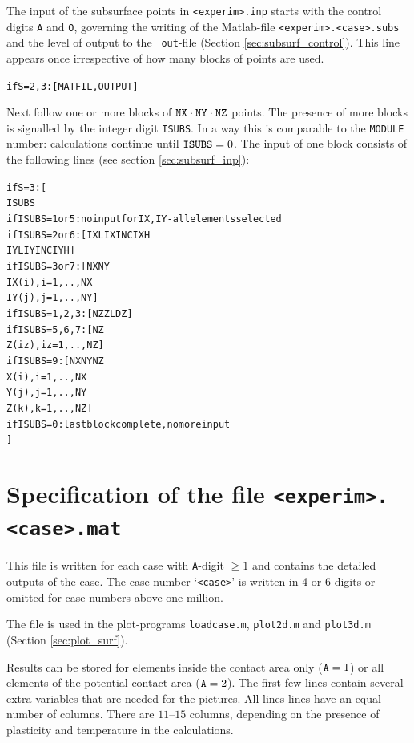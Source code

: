 \documentclass[12pt]{report}
\begin{document}
The input of the subsurface points in {\tt <experim>.inp} starts with the
control digits {\tt A} and {\tt O}, governing the writing of the
Matlab-file {\tt <experim>.<case>.subs} and the level of output to the {\tt
out}-file (Section \ref{sec:subsurf_control}). This line appears once
irrespective of how many blocks of points are used.
\begin{alltt}\small
    if S=2,3: [ MATFIL, OUTPUT ]
\end{alltt}
Next follow one or more blocks of ${\tt NX}\cdot{\tt NY}\cdot{\tt NZ}$
points. The presence of more blocks is signalled by the integer
digit {\tt ISUBS}. In a way this is comparable to the {\tt MODULE} number:
calculations continue until ${\tt ISUBS}=0$. The input of one block
consists of the following lines (see section \ref{sec:subsurf_inp}):
\begin{alltt}\small
    if S=3: [ 
       ISUBS
       if ISUBS=1 or 5:   no input for IX,IY - all elements selected
       if ISUBS=2 or 6: [ IXL IXINC IXH  
                          IYL IYINC IYH      ]
       if ISUBS=3 or 7: [ NX  NY
                          IX(i), i=1,..,NX
                          IY(j), j=1,..,NY   ]
       if ISUBS=1,2,3:  [ NZ  ZL  DZ         ]
       if ISUBS=5,6,7:  [ NZ
                          Z(iz), iz=1,..,NZ  ]
       if ISUBS=9:      [ NX  NY  NZ
                          X(i),  i=1,..,NX
                          Y(j),  j=1,..,NY
                          Z(k),  k=1,..,NZ   ]
       if ISUBS=0:      last block complete, no more input
    ]
\end{alltt}

\section{Specification of the file {\tt <experim>.<case>.mat}}
\label{sec:spec_mat}

This file is written for each case with {\tt A}-digit $\ge 1$ and contains
the detailed outputs of the case. The case number `{\tt <case>}' is
written in 4 or 6 digits or omitted for case-numbers above one million.

The file is used in the plot-programs {\tt loadcase.m}, {\tt plot2d.m} and
{\tt plot3d.m} (Section \ref{sec:plot_surf}).

Results can be stored for elements inside the contact area only
(${\tt A}=1$) or all elements of the potential contact area (${\tt
A}=2$). The first few lines contain several extra variables that are needed
for the pictures. All lines lines have an equal number of columns. There
are $11\text{--}15$ columns, depending on the presence of plasticity and
temperature in the calculations.
\end{document}
